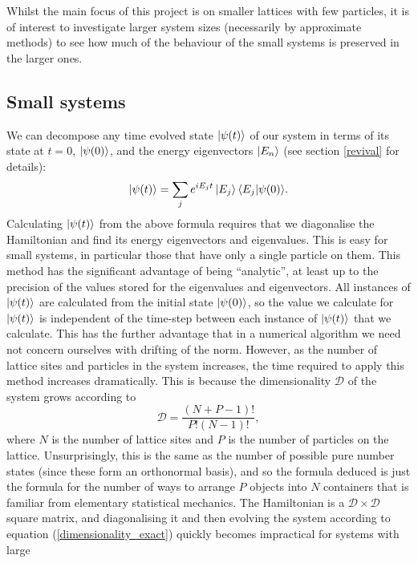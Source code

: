 \documentclass[a4paper, 10pt]{article}
\theoremstyle{plain}
\begin{document}
Whilst the main focus of this project is on smaller lattices with few
particles, it is of interest to investigate larger system sizes (necessarily
by approximate methods) to see how much of the behaviour of the small systems
is preserved in the larger ones.


\subsection{Small systems}

We can decompose any time evolved state $\ket{\psi(t)}$ of our system in terms
of its state at $t=0$, $\ket{\psi(0)}$, and the energy eigenvectors $\ket{E_n}$
(see section \ref{revival} for details):
\begin{equation}
    \ket{\psi(t)} = \sum_{j}{e^{i E_{j}t} \ket{E_{j}} \braket{E_{j}|\psi(0)}}.
\end{equation}
Calculating $\ket{\psi(t)}$ from the above formula requires that we diagonalise
the Hamiltonian and find its energy eigenvectors and eigenvalues. This is easy
for small systems, in particular those that have only a single particle on them.
This method has the significant advantage of being ``analytic'', at least up to
the precision of the values stored for the eigenvalues and eigenvectors. All
instances of $\ket{\psi(t)}$ are calculated from the initial state
$\ket{\psi(0)}$, so the value we calculate for $\ket{\psi(t)}$ is independent of the time-step
between each instance of $\ket{\psi(t)}$ that we calculate. This has the further
advantage that in a numerical algorithm we need not concern ourselves with
drifting of the norm. However, as the number of lattice
sites and particles in the system increases, the time required to apply this
method increases dramatically. This is because the dimensionality $\mathcal{D}$
of the system grows according to
\begin{equation}
    \label{dimensionality_exact}
    \mathcal{D} = \frac{(N + P - 1)!}{P! (N-1)!},
\end{equation}
where $N$ is the number of lattice sites and $P$ is the number of particles on
the lattice. Unsurprisingly, this is the same as the number of possible pure
number states (since these form an orthonormal basis), and so the formula
deduced is just the formula for the number of ways to arrange $P$ objects into
$N$ containers that is familiar from elementary statistical mechanics.
The Hamiltonian is a $\mathcal{D}\times\mathcal{D}$ square matrix, and
diagonalising it and then evolving the system according to equation
(\ref{dimensionality_exact}) quickly becomes impractical for systems with large
\end{document}
